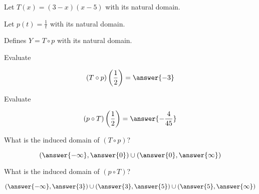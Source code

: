 \documentclass{ximera}
\begin{document}
\begin{example}



Let $T(x) = (3-x)(x-5)$ with its natural domain.


Let $p(t) = \frac{1}{t}$ with its natural domain.


Defines $Y = T \circ p$ with its natural domain.



\begin{question}

Evaluate


\[
(T \circ p)\left( \frac{1}{2} \right) = \answer{-3}
\]



\end{question}






\begin{question}

Evaluate


\[
(p \circ T)\left( \frac{1}{2} \right) = \answer{-\frac{4}{45}}
\]



\end{question}





\begin{question}

What is the induced domain of $(T \circ p)$?


\[
\left( \answer{-\infty}, \answer{0}  \right) \cup \left( \answer{0}, \answer{\infty}  \right)
\]



\end{question}








\begin{question}

What is the induced domain of $(p \circ T)$?


\[
\left( \answer{-\infty}, \answer{3}  \right) \cup \left( \answer{3}, \answer{5}  \right)  \cup \left( \answer{5}, \answer{\infty}  \right)
\]



\end{question}







\end{example}
\end{document}
